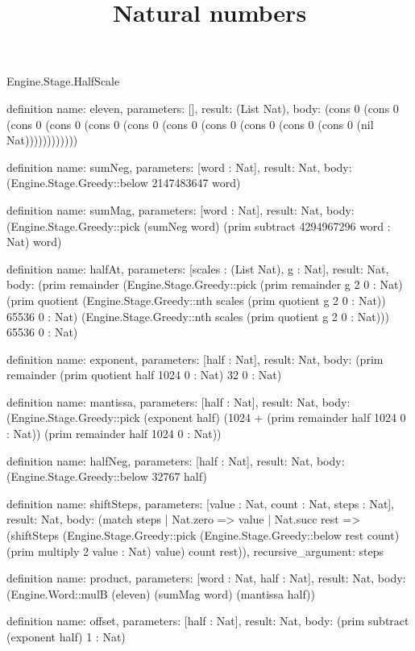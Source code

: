 \begin{lexlean}{Engine.Stage.HalfScale}
\title{Natural numbers}
\begin{semanticmodule}
definition{
  name: eleven,
  parameters: [],
  result: (List Nat),
  body: (cons 0 (cons 0 (cons 0 (cons 0 (cons 0 (cons 0 (cons 0 (cons 0 (cons 0 (cons 0 (cons 0 (nil Nat))))))))))))
}

definition{
  name: sumNeg,
  parameters: [word : Nat],
  result: Nat,
  body: (Engine.Stage.Greedy::below 2147483647 word)
}

definition{
  name: sumMag,
  parameters: [word : Nat],
  result: Nat,
  body: (Engine.Stage.Greedy::pick (sumNeg word) (prim subtract 4294967296 word : Nat) word)
}

definition{
  name: halfAt,
  parameters: [scales : (List Nat), g : Nat],
  result: Nat,
  body: (prim remainder (Engine.Stage.Greedy::pick (prim remainder g 2 0 : Nat) (prim quotient (Engine.Stage.Greedy::nth scales (prim quotient g 2 0 : Nat)) 65536 0 : Nat) (Engine.Stage.Greedy::nth scales (prim quotient g 2 0 : Nat))) 65536 0 : Nat)
}

definition{
  name: exponent,
  parameters: [half : Nat],
  result: Nat,
  body: (prim remainder (prim quotient half 1024 0 : Nat) 32 0 : Nat)
}

definition{
  name: mantissa,
  parameters: [half : Nat],
  result: Nat,
  body: (Engine.Stage.Greedy::pick (exponent half) (1024 + (prim remainder half 1024 0 : Nat)) (prim remainder half 1024 0 : Nat))
}

definition{
  name: halfNeg,
  parameters: [half : Nat],
  result: Nat,
  body: (Engine.Stage.Greedy::below 32767 half)
}

definition{
  name: shiftSteps,
  parameters: [value : Nat, count : Nat, steps : Nat],
  result: Nat,
  body: (match steps
    | Nat.zero => value
    | Nat.succ rest => (shiftSteps (Engine.Stage.Greedy::pick (Engine.Stage.Greedy::below rest count) (prim multiply 2 value : Nat) value) count rest)),
  recursive_argument: steps
}

definition{
  name: product,
  parameters: [word : Nat, half : Nat],
  result: Nat,
  body: (Engine.Word::mulB (eleven) (sumMag word) (mantissa half))
}

definition{
  name: offset,
  parameters: [half : Nat],
  result: Nat,
  body: (prim subtract (exponent half) 1 : Nat)
}


\end{semanticmodule}
\end{lexlean}
